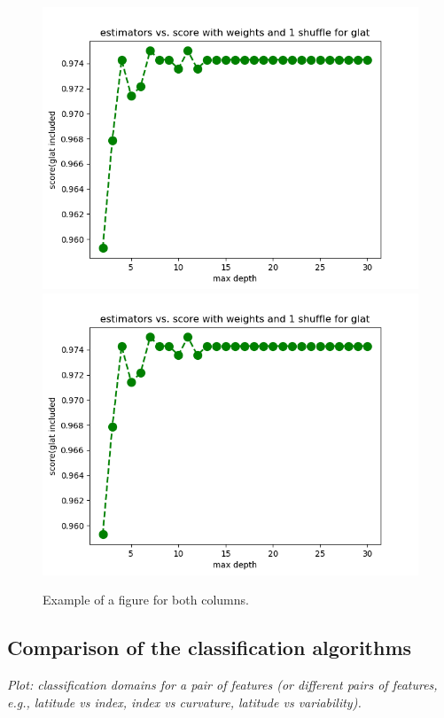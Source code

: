 \begin{figure}[h]
\includegraphics[width=\twopicsp\textwidth]{plots/Rf_maxdepth_oobscore_glat}
\includegraphics[width=\twopicsp\textwidth]{plots/Rf_maxdepth_oobscore_glat}
\caption{
Example of a figure for both columns.
}
\label{fig:Maps_data}
\end{figure}


\subsection{Comparison of the classification algorithms}

{\it Plot: classification domains for a pair of features (or different pairs of features, e.g., latitude vs index, index vs curvature, latitude vs variability).}

